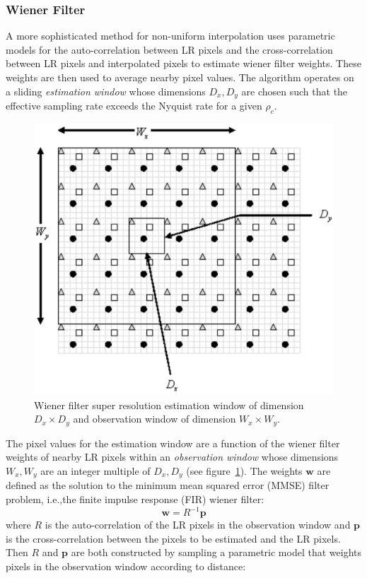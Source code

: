 \subsubsection{Wiener Filter}
A more sophisticated method for non-uniform interpolation uses parametric models for the auto-correlation between LR pixels and the cross-correlation between LR pixels and interpolated pixels to estimate wiener filter weights\cite{wiener}.
%
These weights are then used to average nearby pixel values.
%
The algorithm operates on a sliding \textit{estimation window} whose dimensions \(D_x, D_y\) are chosen such that the effective sampling rate exceeds the Nyquist rate for a given \(\rho_c\).
\begin{figure}
	\centering
	\includegraphics[width=.7\linewidth]{figures/classical/wiener.png}
	\caption{Wiener filter super resolution estimation window of dimension \(D_x \times D_y\) and observation window of dimension \(W_x \times W_y\)\cite{wiener}.}
	\label{fig:wiener}
\end{figure}
The pixel values for the estimation window are a function of the wiener filter weights of nearby LR pixels within an \textit{observation window} whose dimensions \(W_x, W_y\) are an integer multiple of \(D_x, D_y\) (see figure~\ref{fig:wiener}).
%
The weights \(\bm{w}\) are defined as the solution to the minimum mean squared error (MMSE) filter problem, i.e.,the finite impulse response (FIR) wiener filter:
\begin{equation}
	\bm{w} = R^{-1}\bm{p}
\end{equation}
where \(R\) is the auto-correlation of the LR pixels in the observation window and \(\bm{p}\) is the cross-correlation between the pixels to be estimated and the LR pixels.
%
Then \(R\) and \(\bm{p}\) are both constructed by sampling a parametric model that weights pixels in the observation window according to distance:
